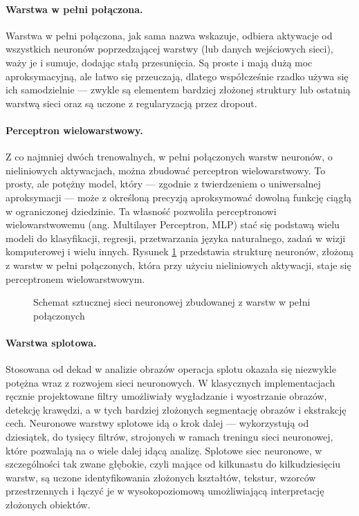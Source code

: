 \paragraph{Warstwa w pełni połączona.}
Warstwa w pełni połączona, jak sama nazwa wskazuje, odbiera aktywacje od wszystkich neuronów poprzedzającej warstwy (lub danych wejściowych sieci), waży je i sumuje, dodając stałą przesunięcia. Są proste i mają dużą moc aproksymacyjną, ale łatwo się przeuczają, dlatego współcześnie rzadko używa się ich samodzielnie --- zwykle są elementem bardziej złożonej struktury lub ostatnią warstwą sieci oraz są uczone z regularyzacją przez dropout.

\paragraph{Perceptron wielowarstwowy.}
Z co najmniej dwóch trenowalnych, w pełni połączonych warstw neuronów, o nieliniowych aktywacjach, można zbudować perceptron wielowarstwowy. To prosty, ale potężny model, który --- zgodnie z twierdzeniem o uniwersalnej aproksymacji --- może z określoną precyzją aproksymować dowolną funkcję ciągłą w ograniczonej dziedzinie. Ta własność pozwoliła perceptronowi wielowarstwowemu (ang. Multilayer Perceptron, MLP) stać się podstawą wielu modeli do klasyfikacji, regresji, przetwarzania języka naturalnego, zadań w wizji komputerowej i wielu innych. Rysunek \ref{fig:siec-w-pelni-polaczona} przedstawia strukturę neuronów, złożoną z warstw w pełni połączonych, która przy użyciu nieliniowych aktywacji, staje się perceptronem wielowarstwowym.
\begin{figure}[t]
	\centering
	
	\caption{Schemat sztucznej sieci neuronowej zbudowanej z warstw w pełni połączonych}
	\label{fig:siec-w-pelni-polaczona}
\end{figure}

\paragraph{Warstwa splotowa.}
Stosowana od dekad w analizie obrazów operacja splotu okazała się niezwykle potężna wraz z rozwojem sieci neuronowych. W klasycznych implementacjach ręcznie projektowane filtry umożliwiały wygładzanie i wyostrzanie obrazów, detekcję krawędzi, a w tych bardziej złożonych segmentację obrazów i ekstrakcję cech. Neuronowe warstwy splotowe idą o krok dalej --- wykorzystują od dziesiątek, do tysięcy filtrów, strojonych w ramach treningu sieci neuronowej, które pozwalają na o wiele dalej idącą analizę. Splotowe siec neuronowe, w szczególności tak zwane głębokie, czyli mające od kilkunastu do kilkudziesięciu warstw, są uczone identyfikowania złożonych kształtów, tekstur, wzorców przestrzennych i łączyć je w wysokopoziomową umożliwiającą interpretację złożonych obiektów.

